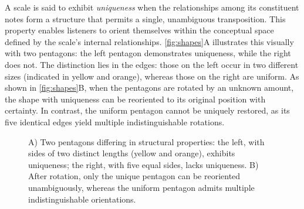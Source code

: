 \documentclass[10pt,twocolumn]{article}
\numberwithin{equation}{section} %
\begin{document}
    A scale is said to exhibit \textit{uniqueness} when the relationships among its constituent notes form a structure that permits a single, unambiguous transposition.
    This property enables listeners to orient themselves within the conceptual space defined by the scale's internal relationships.
    \autoref{fig:shapes}A illustrates this visually with two pentagons: the left pentagon demonstrates uniqueness, while the right does not.
    The distinction lies in the edges: those on the left occur in two different sizes (indicated in yellow and orange), whereas those on the right are uniform.
    As shown in \autoref{fig:shapes}B, when the pentagons are rotated by an unknown amount, the shape with uniqueness can be reoriented to its original position with certainty.
    In contrast, the uniform pentagon cannot be uniquely restored, as its five identical edges yield multiple indistinguishable rotations.

    \begin{figure}[htbp]
        \centering
        \caption{A) Two pentagons differing in structural properties: the left, with sides of two distinct lengths (yellow and orange), exhibits uniqueness; the right, with five equal sides, lacks uniqueness. B) After rotation, only the unique pentagon can be reoriented unambiguously, whereas the uniform pentagon admits multiple indistinguishable orientations.}
        \label{fig:shapes}
    \end{figure}
\end{document}
